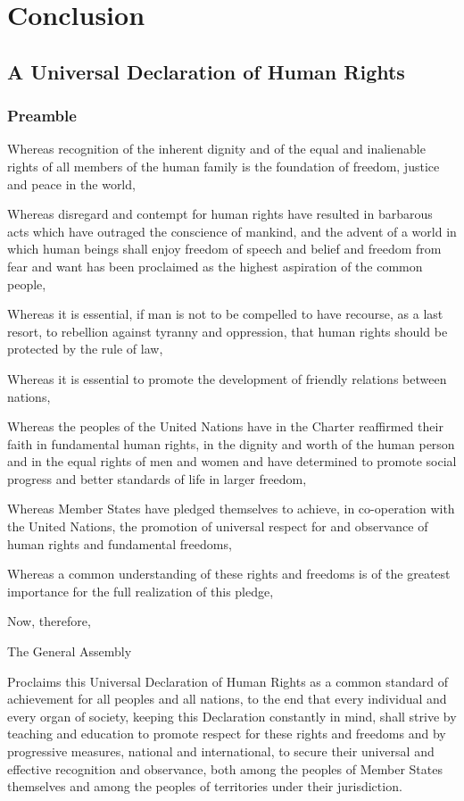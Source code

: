 \documentclass[
  ngerman,
  american,
  titlepage,
  openright,
  DIV=calc,
  toc=listof,
  listof=nochaptergap]{scrbook}
\begin{document}
\chapter{Conclusion}\label{sec-conclusion}

\section{A Universal Declaration of Human
Rights}\label{a-universal-declaration-of-human-rights-4}

\subsection{Preamble}\label{preamble-4}

Whereas recognition of the inherent dignity and of the equal and
inalienable rights of all members of the human family is the foundation
of freedom, justice and peace in the world,

Whereas disregard and contempt for human rights have resulted in
barbarous acts which have outraged the conscience of mankind, and the
advent of a world in which human beings shall enjoy freedom of speech
and belief and freedom from fear and want has been proclaimed as the
highest aspiration of the common people,

Whereas it is essential, if man is not to be compelled to have recourse,
as a last resort, to rebellion against tyranny and oppression, that
human rights should be protected by the rule of law,

Whereas it is essential to promote the development of friendly relations
between nations,

Whereas the peoples of the United Nations have in the Charter reaffirmed
their faith in fundamental human rights, in the dignity and worth of the
human person and in the equal rights of men and women and have
determined to promote social progress and better standards of life in
larger freedom,

Whereas Member States have pledged themselves to achieve, in
co-operation with the United Nations, the promotion of universal respect
for and observance of human rights and fundamental freedoms,

Whereas a common understanding of these rights and freedoms is of the
greatest importance for the full realization of this pledge,

Now, therefore,

The General Assembly

Proclaims this Universal Declaration of Human Rights as a common
standard of achievement for all peoples and all nations, to the end that
every individual and every organ of society, keeping this Declaration
constantly in mind, shall strive by teaching and education to promote
respect for these rights and freedoms and by progressive measures,
national and international, to secure their universal and effective
recognition and observance, both among the peoples of Member States
themselves and among the peoples of territories under their
jurisdiction.
\end{document}
